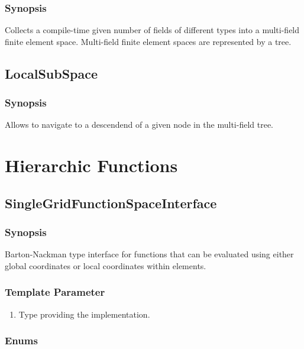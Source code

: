 \documentclass[11pt,a4paper,DIV11,%
notitlepage,oneside,abstracton,%
bibtotoc]{scrartcl}
\begin{document}
\subsubsection{Synopsis}

Collects a compile-time given number of fields of different types into
a multi-field finite element space. 
Multi-field finite element spaces are represented by a tree.


\subsection{LocalSubSpace}

\subsubsection{Synopsis}

Allows to navigate to a descendend of a given node in the multi-field
tree.

\section{Hierarchic Functions}

\subsection{SingleGridFunctionSpaceInterface}

\subsubsection{Synopsis}

Barton-Nackman type interface for
functions that can be evaluated using either global coordinates
or local coordinates within elements.

\subsubsection{Template Parameter}

\begin{enumerate}[1)]
\item Type providing the implementation.
\end{enumerate}

\subsubsection{Enums}
\end{document}
